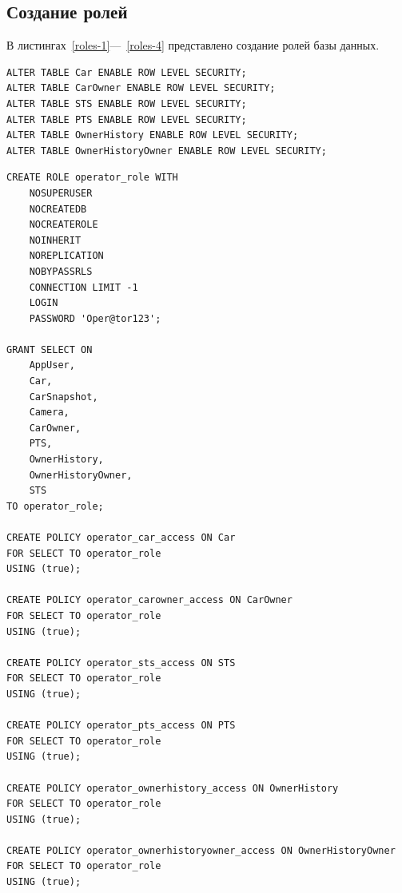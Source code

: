 \subsection{Создание ролей}

В листингах~\ref{roles-1}---~\ref{roles-4}  представлено создание ролей базы данных.

\begin{center}
\captionsetup{justification=raggedright,singlelinecheck=off}
\begin{lstlisting}[label=roles-1, caption=Активация Row-Level Security (RLS)]
ALTER TABLE Car ENABLE ROW LEVEL SECURITY;
ALTER TABLE CarOwner ENABLE ROW LEVEL SECURITY;
ALTER TABLE STS ENABLE ROW LEVEL SECURITY;
ALTER TABLE PTS ENABLE ROW LEVEL SECURITY;
ALTER TABLE OwnerHistory ENABLE ROW LEVEL SECURITY;
ALTER TABLE OwnerHistoryOwner ENABLE ROW LEVEL SECURITY;
\end{lstlisting}
\end{center}

\begin{center}
\captionsetup{justification=raggedright,singlelinecheck=off}
\begin{lstlisting}[label=roles-2, caption=Создание роли оператора]
CREATE ROLE operator_role WITH
    NOSUPERUSER
    NOCREATEDB
    NOCREATEROLE
    NOINHERIT
    NOREPLICATION
    NOBYPASSRLS
    CONNECTION LIMIT -1
    LOGIN
    PASSWORD 'Oper@tor123';

GRANT SELECT ON 
    AppUser,
    Car,
    CarSnapshot,
    Camera,
    CarOwner,
    PTS,
    OwnerHistory,
    OwnerHistoryOwner,
    STS
TO operator_role;

CREATE POLICY operator_car_access ON Car
FOR SELECT TO operator_role
USING (true);

CREATE POLICY operator_carowner_access ON CarOwner
FOR SELECT TO operator_role
USING (true);

CREATE POLICY operator_sts_access ON STS
FOR SELECT TO operator_role
USING (true);

CREATE POLICY operator_pts_access ON PTS
FOR SELECT TO operator_role
USING (true);

CREATE POLICY operator_ownerhistory_access ON OwnerHistory
FOR SELECT TO operator_role
USING (true);

CREATE POLICY operator_ownerhistoryowner_access ON OwnerHistoryOwner
FOR SELECT TO operator_role
USING (true);
\end{lstlisting}
\end{center}

